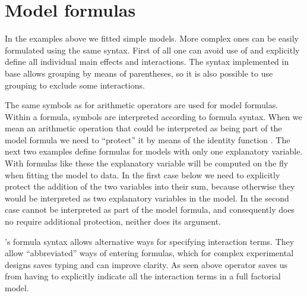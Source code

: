 \documentclass[krantz2]{krantz}\usepackage{knitr}%
\begin{document}

\section{Model formulas}
  In the examples above we fitted simple models. More complex ones can be easily formulated using the same syntax. First of all one can avoid use of \code{*} and explicitly define all individual main effects and interactions. The syntax implemented in base \Rlang allows grouping by means of parentheses, so it is also possible to use grouping to exclude some interactions.

The same symbols as for arithmetic operators are used for model formulas. Within a formula, symbols are interpreted according to formula syntax. When we mean an arithmetic operation that could be interpreted as being part of the model formula we need to ``protect'' it by means of the identity function . The next two examples define formulas for models with only one explanatory variable. With formulas like these the explanatory variable will be computed on the fly when fitting the model to data. In the first case below we need to explicitly protect the addition of the two variables into their sum, because otherwise they would be interpreted as two explanatory variables in the model. In the second case  cannot be interpreted as part of the model formula, and consequently does no require additional protection, neither does its argument.

\begin{knitrout}\footnotesize
{}\color{fgcolor}\begin{kframe}
\begin{alltt}
 \hlopt{~}  \hlopt{+} 
 \hlopt{~}  \hlopt{+} 
\end{alltt}
\end{kframe}
\end{knitrout}

\Rlang's formula syntax allows alternative ways for specifying interaction terms. They allow ``abbreviated'' ways of entering formulas, which for complex experimental designs saves typing and can improve clarity. As seen above operator \code{*} saves us from having to explicitly indicate all the interaction terms in a full factorial model.

\begin{knitrout}\footnotesize
{}\color{fgcolor}\begin{kframe}
\begin{alltt}
 \hlopt{~}  \hlopt{+}  \hlopt{+}  \hlopt{+} \hlopt{:} \hlopt{+} \hlopt{:} \hlopt{+} \hlopt{:} \hlopt{+} \hlopt{:}\hlopt{:}
\end{alltt}
\end{kframe}
\end{knitrout}
\end{document}
